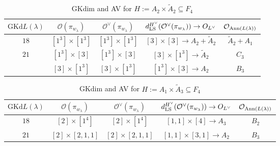 \documentclass[reqno,12pt]{amsart}
\numberwithin{equation}{section}
\theoremstyle{plain}
\theoremstyle{definition}
\newcommand{\lam}{\lambda}
\renewcommand{\subset}{\subseteq}
\begin{document}
\begin{table}[htbp]\caption{ GKdim and AV for $H:=A_2\times \tilde{A}_2\subset F_4$ }
	\label{taba2a2}
	\centering
	\renewcommand{\arraystretch}{1.5}
	\setlength\tabcolsep{5pt}
	
{	\begin{tabular}{|c|c|c|c|c|}
		\hline $\mathrm{GKd} L(\lambda)$ &     $\mathcal{O}({\pi_{w_{\lam}}})$  &    $\mathcal{O}^{\vee}({\pi_{w_{\lam}}})$   & $d_{\rm LS}^{H^{\vee}}(\mathcal{O}^{\vee}(\pi_{w_\lambda}))\rightarrow    O_{L^\vee}$& $\mathcal{O}_{{\rm Ann}(L(\lambda))}$ \\ \hline


$18$ 
&  $ [1^3]\times [1^3]$ & $ [1^3]\times [1^3]$ & \small{$[3]\times [3]\rightarrow A_2+\tilde{A}_2$}&   $\tilde{A}_2+A_1$ \\
\hline

$21$&  $ [1^3]\times [3]$ &  $ [1^3]\times [3]$ & \small{$[3]\times [1^3]\rightarrow \tilde{A}_2$}&   $C_3$ \\
&  $ [3]\times [1^3]$ &  $ [3]\times [1^3]$ & \small{$[1^3]\times [3]\rightarrow {A}_2$}&   $B_3$ \\
\hline

\end{tabular}}
	\bigskip
	

\end{table}

\begin{table}[htbp]\caption{ GKdim and AV for $H:=A_1\times \tilde{A}_3\subset F_4$}
	\label{taba1a3}
	\centering
	\renewcommand{\arraystretch}{1.5}
	\setlength\tabcolsep{5pt}
	
{	\begin{tabular}{|c|c|c|c|c|}
		\hline $\mathrm{GKd} L(\lambda)$ &     $\mathcal{O}({\pi_{w_{\lam}}})$  &    $\mathcal{O}^{\vee}({\pi_{w_{\lam}}})$ &$d_{\rm LS}^{H^{\vee}}(\mathcal{O}^{\vee}(\pi_{w_\lambda}))\rightarrow    O_{L^\vee}$& $\mathcal{O}_{{\rm Ann}(L(\lambda))}$\\ \hline


$18$ 
&  $ [2]\times [1^4]$ &  $ [2]\times [1^4]$ & \small{$[1,1]\times [4]\rightarrow A_3$}&   $B_2$ \\
\hline

$21$&  $ [2]\times [2,1,1]$ &  $ [2]\times [2,1,1]$ & \small{$[1,1]\times [3,1]\rightarrow {A}_2$}&   $B_3$ \\
\hline

\end{tabular}}
	\bigskip
	

\end{table}
\end{document}
